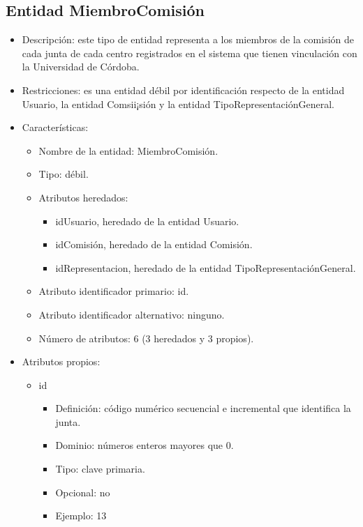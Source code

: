 \subsection{Entidad MiembroComisión}
\begin{itemize}
    \item Descripción: este tipo de entidad representa a los miembros de la comisión de cada junta de cada centro registrados en el sistema que tienen vinculación con la Universidad de Córdoba.
    \item Restricciones: es una entidad débil por identificación respecto de la entidad Usuario, la entidad Comsii¡sión y la entidad TipoRepresentaciónGeneral.
    \item Características:
    \begin{itemize}
        \item Nombre de la entidad: MiembroComisión.
        \item Tipo: débil.
        \item Atributos heredados: 
        \begin{itemize}
            \item idUsuario, heredado de la entidad Usuario.
            \item idComisión, heredado de la entidad Comisión.
            \item idRepresentacion, heredado de la entidad TipoRepresentaciónGeneral.
        \end{itemize} 
        \item Atributo identificador primario: id.
        \item Atributo identificador alternativo: ninguno.
        \item Número de atributos: 6 (3 heredados y 3 propios).
    \end{itemize}

    \item Atributos propios:
    \begin{itemize}
        \item id
        \begin{itemize}
            \item Definición: código numérico secuencial e incremental que identifica la junta.
            \item Dominio: números enteros mayores que 0.
            \item Tipo: clave primaria.
            \item Opcional: no
            \item Ejemplo: 13
        \end{itemize}


\end{itemize}
\end{itemize}
